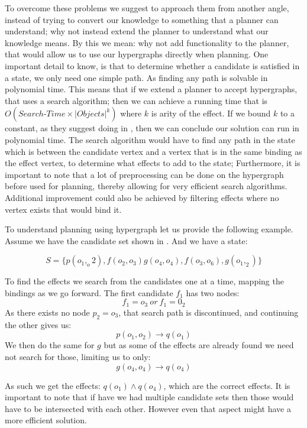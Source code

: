 \documentclass[../Master.tex]{subfiles}
\begin{document}
To overcome these problems we suggest to approach them from another angle, 
instead of trying to convert our knowledge to something that a planner can understand; 
why not instead extend the planner to understand what our knowledge means.
By this we mean: why not add functionality to the planner, that would allow us to use our hypergraphs directly when planning.
One important detail to know, is that to determine whether a candidate is satisfied in a state, we only need one simple path. 
As finding any path is solvable in polynomial time. 
This means that if we extend a planner to accept hypergraphs, that uses a search algorithm;
then we can achieve a running time that is $O(Search\texttt{-}Time \times \left| Objects \right|^k)$ where $k$ is arity of the effect. 
If we bound $k$ to a constant, as they suggest doing in \cite{Walsh2008}, then we can conclude our solution can run in polynomial time. 
The search algorithm would have to find any path in the state which is between the candidate vertex and a vertex that is in the same binding as the effect vertex, to determine what effects to add to the state; 
Furthermore, it is important to note that a lot of preprocessing can be done on the hypergraph before used for planning, thereby allowing for very efficient search algorithms. 
Additional improvement could also be achieved by filtering effects where no vertex exists that would bind it.

\begin{example} To understand planning using hypergraph let us provide the following example.
	Assume we have the candidate set shown in . And we have a state:
	
	\begin{equation*}
		S = \{ p(o_1,_o2), f(o_2,o_3) g(o_4,o_4), f(o_3,o_6), g(o_1,_2) \}
	\end{equation*}
	
	To find the effects we search from the candidates one at a time, mapping the bindings as we go forward.
	The first candidate $f_1$ has two nodes:
	\begin{equation*}
		f_1 = o_3 ~ or ~ f_1 = 0_2
	\end{equation*}
	 As there exists no node $p_2 = o_3$, that search path is discontinued, and continuing the other gives us:
	 \begin{equation*}
		 p(o_1,o_2) \rightarrow q(o_1)
	 \end{equation*}
	 We then do the same for $g$ but as some of the effects are already found we need not search for those, limiting us to only:
	 \begin{equation*}
		 g(o_4,o_4) \rightarrow q(o_4)
	 \end{equation*}
	 
	 As such we get the effects: $q(o_1)\land q(o_4)$, which are the correct effects.
	 It is important to note that if have we had multiple candidate sets then those would have to be intersected with each other. 
	 However even that aspect might have a more efficient solution.
	
\end{example}
\end{document}
